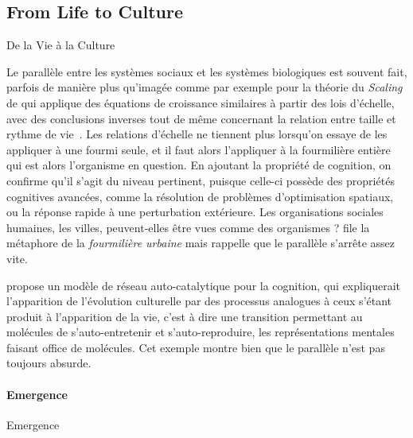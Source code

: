 \cite{duda2013cybernetics}





\subsection{From Life to Culture}{De la Vie à la Culture}

Le parallèle entre les systèmes sociaux et les systèmes biologiques est souvent fait, parfois de manière plus qu'imagée comme par exemple pour la théorie du \emph{Scaling} de  qui applique des équations de croissance similaires à partir des lois d'échelle, avec des conclusions inverses tout de même concernant la relation entre taille et rythme de vie~\cite{bettencourt2007growth}. Les relations d'échelle ne tiennent plus lorsqu'on essaye de les appliquer à une fourmi seule, et il faut alors l'appliquer à la fourmilière entière qui est alors l'organisme en question. En ajoutant la propriété de cognition, on confirme qu'il s'agit du niveau pertinent, puisque celle-ci possède des propriétés cognitives avancées, comme la résolution de problèmes d'optimisation spatiaux, ou la réponse rapide à une perturbation extérieure. Les organisations sociales humaines, les villes, peuvent-elles être vues comme des organismes ?  file la métaphore de la \emph{fourmilière urbaine} mais rappelle que le parallèle s'arrête assez vite.



\cite{2017arXiv170305917G} propose un modèle de réseau auto-catalytique pour la cognition, qui expliquerait l'apparition de l'évolution culturelle par des processus analogues à ceux s'étant produit à l'apparition de la vie, c'est à dire une transition permettant au molécules de s'auto-entretenir et s'auto-reproduire, les représentations mentales faisant office de molécules. Cet exemple montre bien que le parallèle n'est pas toujours absurde.



\paragraph{Emergence}{Emergence}

